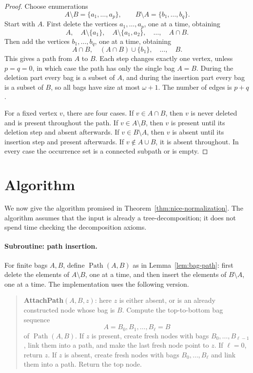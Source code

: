 \documentclass[11pt]{article}
\theoremstyle{definition}
\begin{document}
\begin{proof}
Choose enumerations
\[
  A\setminus B=\{a_1,\ldots,a_p\},
  \qquad
  B\setminus A=\{b_1,\ldots,b_q\}.
\]
Start with \(A\).  First delete the vertices \(a_1,\ldots,a_p\), one at a time,
obtaining
\[
  A,\quad
  A\setminus\{a_1\},\quad
  A\setminus\{a_1,a_2\},\quad \ldots,\quad A\cap B.
\]
Then add the vertices \(b_1,\ldots,b_q\), one at a time, obtaining
\[
  A\cap B,\quad
  (A\cap B)\cup\{b_1\},\quad \ldots,\quad B.
\]
This gives a path from \(A\) to \(B\).  Each step changes exactly one vertex,
unless \(p=q=0\), in which case the path has only the single bag \(A=B\).
During the deletion part every bag is a subset of \(A\), and during the
insertion part every bag is a subset of \(B\), so all bags have size at most
\(\omega+1\).  The number of edges is \(p+q\).

For a fixed vertex \(v\), there are four cases.  If \(v\in A\cap B\), then
\(v\) is never deleted and is present throughout the path.  If
\(v\in A\setminus B\), then \(v\) is present until its deletion step and absent
afterwards.  If \(v\in B\setminus A\), then \(v\) is absent until its insertion
step and present afterwards.  If \(v\notin A\cup B\), it is absent throughout.
In every case the occurrence set is a connected subpath or is empty.
\end{proof}

\section{Algorithm}

We now give the algorithm promised in Theorem~\ref{thm:nice-normalization}.
The algorithm assumes that the input is already a tree-decomposition; it does
not spend time checking the decomposition axioms.

\paragraph{Subroutine: path insertion.}
For finite bags \(A,B\), define \(\operatorname{Path}(A,B)\) as in
Lemma~\ref{lem:bag-path}: first delete the elements of \(A\setminus B\), one at
a time, and then insert the elements of \(B\setminus A\), one at a time.  The
implementation uses the following version.

\begin{quote}
\textbf{AttachPath}\((A,B,z)\): here \(z\) is either absent, or is an already
constructed node whose bag is \(B\).  Compute the top-to-bottom bag sequence
\[
  A=B_0,B_1,\ldots,B_\ell=B
\]
of \(\operatorname{Path}(A,B)\).  If \(z\) is present, create fresh nodes with
bags \(B_0,\ldots,B_{\ell-1}\), link them into a path, and make the last fresh
node point to \(z\).  If \(\ell=0\), return \(z\).  If \(z\) is absent, create
fresh nodes with bags \(B_0,\ldots,B_\ell\) and link them into a path.  Return
the top node.
\end{quote}
\end{document}
